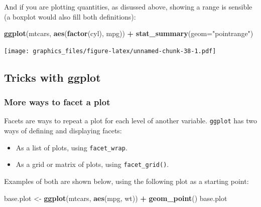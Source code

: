 \documentclass[]{article}
\newenvironment{Shaded}{\begin{snugshade}}{\end{snugshade}}
\newcommand{\KeywordTok}[1]{\textcolor[rgb]{0.13,0.29,0.53}{\textbf{#1}}}
\newcommand{\DataTypeTok}[1]{\textcolor[rgb]{0.13,0.29,0.53}{#1}}
\newcommand{\StringTok}[1]{\textcolor[rgb]{0.31,0.60,0.02}{#1}}
\newcommand{\OperatorTok}[1]{\textcolor[rgb]{0.81,0.36,0.00}{\textbf{#1}}}
\newcommand{\NormalTok}[1]{#1}
\providecommand{\tightlist}{%
  \setlength{\itemsep}{0pt}\setlength{\parskip}{0pt}}
\theoremstyle{definition}
\theoremstyle{definition}
\theoremstyle{definition}
\theoremstyle{remark}
\begin{document}
And if you are plotting quantities, as disussed above, showing a range
is sensible (a boxplot would also fill both definitions):

\begin{Shaded}
\begin{Highlighting}[]
\KeywordTok{ggplot}\NormalTok{(mtcars, }\KeywordTok{aes}\NormalTok{(}\KeywordTok{factor}\NormalTok{(cyl), mpg)) }\OperatorTok{+}\StringTok{ }
\StringTok{  }\KeywordTok{stat_summary}\NormalTok{(}\DataTypeTok{geom=}\StringTok{"pointrange"}\NormalTok{)}
\end{Highlighting}
\end{Shaded}

\texttt{[image: graphics\_files/figure-latex/unnamed-chunk-38-1.pdf]}

\subsection*{Tricks with ggplot}\label{ggplot-details}

\hypertarget{facetting-plots}{\subsubsection*{More ways to facet a
plot}\label{facetting-plots}}

Facets are ways to repeat a plot for each level of another variable.
\texttt{ggplot} has two ways of defining and displaying facets:

\begin{itemize}
\tightlist
\item
  As a list of plots, using \texttt{facet\_wrap}.
\item
  As a grid or matrix of plots, using \texttt{facet\_grid()}.
\end{itemize}

Examples of both are shown below, using the following plot as a starting
point:

\begin{Shaded}
\begin{Highlighting}[]
\NormalTok{base.plot <-}\StringTok{ }\KeywordTok{ggplot}\NormalTok{(mtcars, }\KeywordTok{aes}\NormalTok{(mpg, wt)) }\OperatorTok{+}\StringTok{ }\KeywordTok{geom_point}\NormalTok{()}
\NormalTok{base.plot}
\end{Highlighting}
\end{Shaded}
\end{document}
